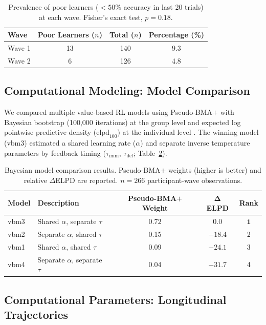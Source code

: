 \documentclass[11pt]{article}
\begin{document}
\begin{table}[H]
\centering
\caption{Prevalence of poor learners ($< 50\%$ accuracy in last 20 trials) at each wave. Fisher's exact test, $p = 0.18$.}
\label{tab:poor_learners}
\begin{tabular}{lccc}
\toprule
\textbf{Wave} & \textbf{Poor Learners ($n$)} & \textbf{Total ($n$)} & \textbf{Percentage (\%)} \\
\midrule
Wave 1 & 13 & 140 & 9.3 \\
Wave 2 & 6 & 126 & 4.8 \\
\bottomrule
\end{tabular}
\end{table}

\subsection{Computational Modeling: Model Comparison}

We compared multiple value-based RL models using Pseudo-BMA$+$ with Bayesian bootstrap (100,000 iterations) at the group level and expected log pointwise predictive density ($\text{elpd}_{100}$) at the individual level \citep{yao2018using}. The winning model (vbm3) estimated a shared learning rate ($\alpha$) and separate inverse temperature parameters by feedback timing ($\tau_{\text{imm}}$, $\tau_{\text{del}}$; Table~\ref{tab:model_comparison}).

\begin{table}[H]
\centering
\caption{Bayesian model comparison results. Pseudo-BMA$+$ weights (higher is better) and relative $\Delta$ELPD are reported. $n = 266$ participant-wave observations.}
\label{tab:model_comparison}
\begin{tabular}{llccc}
\toprule
\textbf{Model} & \textbf{Description} & \textbf{Pseudo-BMA$+$ Weight} & $\boldsymbol{\Delta}$\textbf{ELPD} & \textbf{Rank} \\
\midrule
vbm3 & Shared $\alpha$, separate $\tau$ & $\mathbf{0.72}$ & 0.0 & $\mathbf{1}$ \\
vbm2 & Separate $\alpha$, shared $\tau$ & 0.15 & $-18.4$ & 2 \\
vbm1 & Shared $\alpha$, shared $\tau$ & 0.09 & $-24.1$ & 3 \\
vbm4 & Separate $\alpha$, separate $\tau$ & 0.04 & $-31.7$ & 4 \\
\bottomrule
\end{tabular}
\end{table}

\subsection{Computational Parameters: Longitudinal Trajectories}
\end{document}
